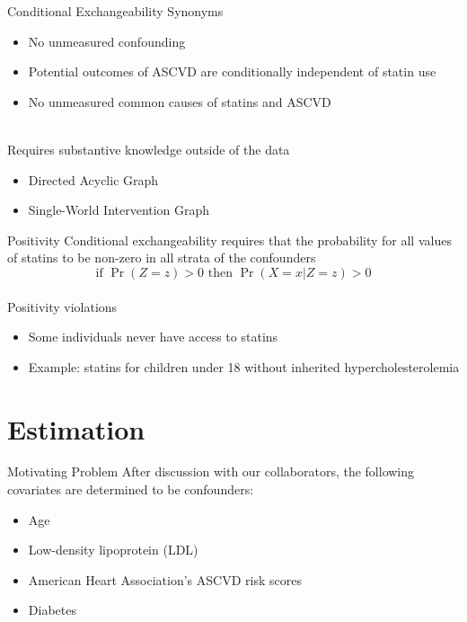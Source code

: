 \documentclass{beamer}
\begin{document}
\begin{frame}{Conditional Exchangeability}
	Synonyms
	\begin{itemize}
		\item No unmeasured confounding
		\item Potential outcomes of ASCVD are conditionally independent of statin use
		\item No unmeasured common causes of statins and ASCVD
	\end{itemize}~\\
	Requires substantive knowledge outside of the data
	\begin{itemize}
		\item Directed Acyclic Graph
		\item Single-World Intervention Graph
	\end{itemize}
\end{frame}


\begin{frame}{Positivity}
	Conditional exchangeability requires that the probability for all values of statins to be non-zero in all strata of the confounders	
	\[\text{if } \Pr(Z=z)>0 \text{ then } \Pr(X=x|Z=z)>0\]~\\
	Positivity violations
	\begin{itemize}
		\item Some individuals never have access to statins
		\item Example: statins for children under 18 without inherited hypercholesterolemia 
	\end{itemize}
\end{frame}

\section{Estimation}

\begin{frame}{Motivating Problem}
	After discussion with our collaborators, the following covariates are determined to be confounders:
	\begin{itemize}
		\item Age
		\item Low-density lipoprotein (LDL)
		\item American Heart Association's ASCVD risk scores
		\item Diabetes
	\end{itemize} 
\end{frame}
\end{document}
